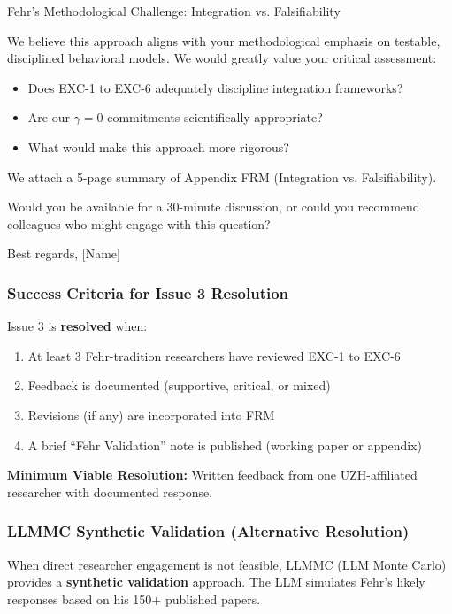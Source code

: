 \begin{chapter}{Fehr's Methodological Challenge: Integration vs. Falsifiability}
\begin{tcolorbox}[colback=gray!5!white,colframe=gray!75!black,title=\textbf{Email Draft for Fehr-Tradition Researchers}]
We believe this approach aligns with your methodological emphasis on testable, disciplined behavioral models. We would greatly value your critical assessment:
\begin{itemize}[noitemsep]
    \item Does EXC-1 to EXC-6 adequately discipline integration frameworks?
    \item Are our $\gamma = 0$ commitments scientifically appropriate?
    \item What would make this approach more rigorous?
\end{itemize}

We attach a 5-page summary of Appendix FRM (Integration vs. Falsifiability).

Would you be available for a 30-minute discussion, or could you recommend colleagues who might engage with this question?

Best regards, [Name]
\end{tcolorbox}

\subsubsection{Success Criteria for Issue 3 Resolution}

Issue 3 is \textbf{resolved} when:
\begin{enumerate}[noitemsep]
    \item At least 3 Fehr-tradition researchers have reviewed EXC-1 to EXC-6
    \item Feedback is documented (supportive, critical, or mixed)
    \item Revisions (if any) are incorporated into FRM
    \item A brief ``Fehr Validation'' note is published (working paper or appendix)
\end{enumerate}

\textbf{Minimum Viable Resolution:} Written feedback from one UZH-affiliated researcher with documented response.

\subsubsection{LLMMC Synthetic Validation (Alternative Resolution)}
\label{sec:llmmc-fehr}

When direct researcher engagement is not feasible, LLMMC (LLM Monte Carlo) provides a \textbf{synthetic validation} approach. The LLM simulates Fehr's likely responses based on his 150+ published papers.


\end{chapter}

